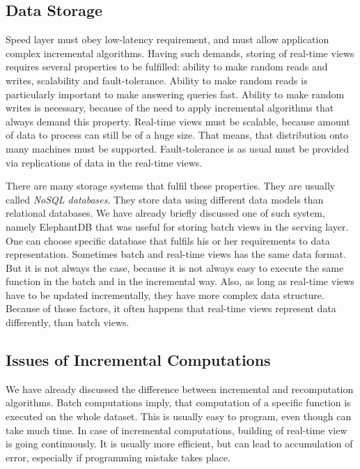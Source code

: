 \subsection{Data Storage}

Speed layer must obey low-latency requirement, and must allow application complex incremental algorithms.
Having such demands, storing of real-time views requires several properties to be fulfilled: ability to make random reads and writes, scalability and fault-tolerance.
Ability to make random reads is particularly important to make answering queries fast.
Ability to make random writes is necessary, because of the need to apply incremental algorithms that always demand this property.
Real-time views must be scalable, because amount of data to process can still be of a huge size.
That means, that distribution onto many machines must be supported.
Fault-tolerance is as usual must be provided via replications of data in the real-time views.

There are many storage systems that fulfil these properties.
They are usually called \textit{NoSQL databases}.
They store data using different data models than relational databases.
We have already briefly discussed one of such system, namely ElephantDB that was useful for storing batch views in the serving layer.
One can choose specific database that fulfils his or her requirements to data representation.
Sometimes batch and real-time views has the same data format.
But it is not always the case, because it is not always easy to execute the same function in the batch and in the incremental way.
Also, as long as real-time views have to be updated incrementally, they have more complex data structure.
Because of those factors, it often happens that real-time views represent data differently, than batch views.

\subsection{Issues of Incremental Computations}

We have already discussed the difference between incremental and recomputation algorithms.
Batch computations imply, that computation of a specific function is executed on the whole dataset.
This is usually easy to program, even though can take much time.
In case of incremental computations, building of real-time view is going continuously.
It is usually more efficient, but can lead to accumulation of error, especially if programming mistake takes place.

